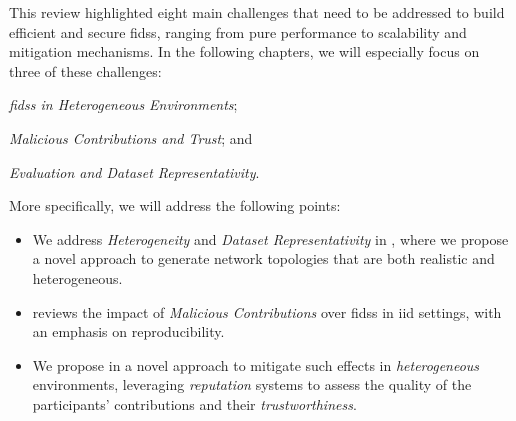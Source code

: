 This review highlighted eight main challenges that need to be addressed to build efficient and secure \glspl{fids}, ranging from pure performance to scalability and mitigation mechanisms.
In the following chapters, we will especially focus on three of these challenges: 
\begin{enumerate*}[(i)]
    \item \emph{\glspl{fids} in Heterogeneous Environments};
    \item \emph{Malicious Contributions and Trust}; and
    \item \emph{Evaluation and Dataset Representativity}.
\end{enumerate*}
More specifically, we will address the following points:
\begin{itemize}
  \item We address \emph{Heterogeneity} and \emph{Dataset Representativity} in , where we propose a novel approach to generate network topologies that are both realistic and heterogeneous.
  
  \item {} reviews the impact of \emph{Malicious Contributions} over \glspl{fids} in \gls{iid} settings, with an emphasis on reproducibility.
  
  \item We propose in  a novel approach to mitigate such effects in \emph{heterogeneous} environments, leveraging \emph{reputation} systems to assess the quality of the participants' contributions and their \emph{trustworthiness}.
\end{itemize}